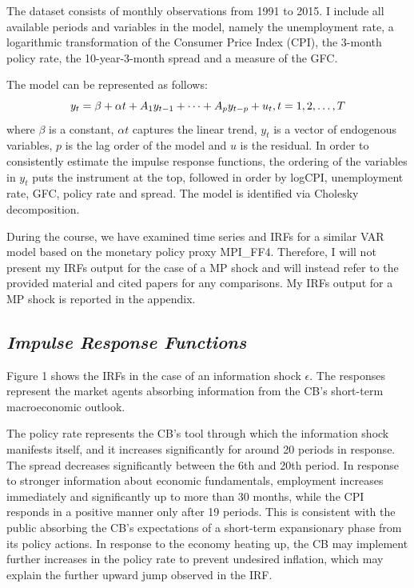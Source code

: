 \documentclass[11pt,a4paper]{article}
\begin{document}
The dataset consists of monthly observations from 1991 to 2015. I include all available periods and variables in the model, namely the unemployment rate, a logarithmic transformation of the Consumer Price Index (CPI), the 3-month policy rate, the 10-year-3-month spread and a measure of the GFC.

The model can be represented as follows:
$$
y_t = \beta + \alpha t + A_1 y_{t-1}+\dots + A_p y_{t-p} + u_t ,
\space t=1,2,\dots, T
$$
where $\beta$ is a constant, $\alpha t$ captures the linear trend, $y_t$ is a vector of endogenous variables, $p$ is the lag order of the model and $u$ is the residual. In order to consistently estimate the impulse response functions, the ordering of the variables in $y_t$ puts the instrument at the top, followed in order by logCPI, unemployment rate, GFC, policy rate and spread. The model is identified via Cholesky decomposition.

During the course, we have examined time series and IRFs for a similar VAR model based on the monetary policy proxy MPI\_FF4. Therefore, I will not present my IRFs output for the case of a MP shock and will instead refer to the provided material and cited papers for any comparisons. My IRFs output for a MP shock is reported in the appendix.





\subsection{\textit{Impulse Response Functions}}
Figure 1 shows the IRFs in the case of an information shock $\epsilon$. The responses represent the market agents absorbing information from the CB's short-term macroeconomic outlook.

The policy rate represents the CB's tool through which the information shock manifests itself, and it increases significantly for around 20 periods in response. The spread decreases significantly between the 6th and 20th period.
In response to stronger information about economic fundamentals, employment increases immediately and significantly up to more than 30 months, while the CPI responds in a positive manner only after 19 periods. This is consistent with the public absorbing the CB's expectations of a short-term expansionary phase from its policy actions. 
In response to the economy heating up, the CB may implement further increases in the policy rate to prevent undesired inflation, which may explain the further upward jump observed in the IRF.
\end{document}
